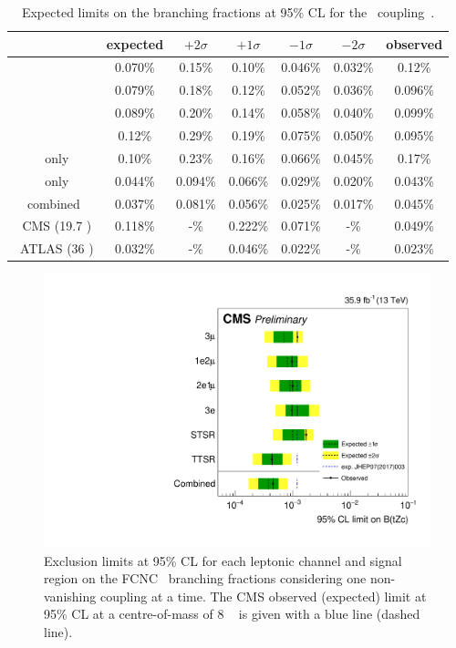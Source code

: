 \begin{table}[htbp]
	\centering
	\caption{Expected limits on the branching fractions at 95\% CL for the \Zct\ coupling~\cite{Sirunyan:2017kkr,ATLAS-CONF-2017-070}.}
	\begin{tabular}{ccccccc}
		\toprule
		& expected & $+2\sigma$ & $+1\sigma$ & $-1\sigma$ & $-2\sigma$ & observed \\ 
		\midrule
		\mumumu\ & 0.070\% & 0.15\% & 0.10\% & 0.046\% & 0.032\% & 0.12\% \\ 
		
		\emumu\ & 0.079\% & 0.18\% & 0.12\% & 0.052\% & 0.036\% & 0.096\% \\ 
		
		\eemu\ & 0.089\% & 0.20\% & 0.14\% & 0.058\% & 0.040\% & 0.099\% \\ 
		
		\eee\ & 0.12\% & 0.29\% & 0.19\% & 0.075\% & 0.050\% & 0.095\% \\ 
		\hdashline
		\STSR\ only & 0.10\% & 0.23\% & 0.16\% & 0.066\% & 0.045\% & 0.17\% \\ 
		
		\TTSR\ only & 0.044\% & 0.094\% & 0.066\% & 0.029\% & 0.020\% & 0.043\% \\ 
		\hdashline 
		combined & 0.037\% & 0.081\% & 0.056\% & 0.025\% & 0.017\% & 0.045\% \\ 
		\hdashline
		8 \TeV\ CMS (19.7 \fbinv)    & 0.118\% & -\% &0.222\% & 0.071\% & -\% & 0.049\%\\
		\hdashline
		13 \TeV\ ATLAS (36 \fbinv)    & 0.032\% & -\% & 0.046\% & 0.022\%& -\% & 0.023\%\\
		\hline
	\end{tabular} 
	\label{tab:ResultsTZC}
\end{table}
\begin{figure}[htbp]
	\centering
	\includegraphics[width=0.7\linewidth]{6_Search/Figures/TOP-17-017_limitsZct.pdf}
	\caption{Exclusion limits at 95\% CL for each leptonic channel and signal region on the FCNC \Zct\ branching fractions considering one non-vanishing coupling at a time. The CMS observed (expected) limit at 95\% CL at a centre-of-mass of 8 \TeV~\cite{Sirunyan:2017kkr} is given with a blue line (dashed line).}	
	\label{fig:exclusionlimitbrcompc}
\end{figure}

